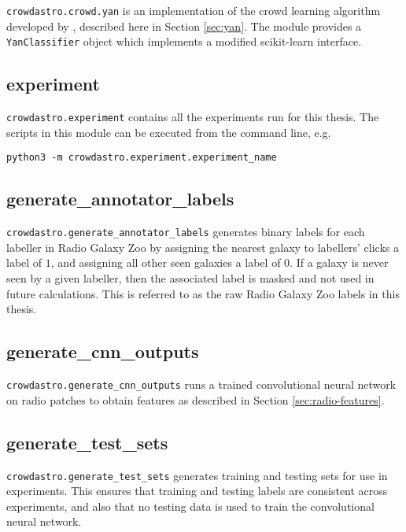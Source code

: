             \texttt{crowdastro.crowd.yan} is an implementation of the crowd
            learning algorithm developed by \citet{yan10}, described here in
            Section \ref{sec:yan}. The module provides a \texttt{YanClassifier}
            object which implements a modified scikit-learn interface.

    \subsection{experiment}
    \label{sec:crowdastro-experiment}

        \texttt{crowdastro.experiment} contains all the experiments run for this
        thesis. The scripts in this module can be executed from the command
        line, e.g.

        \begin{center}
            \texttt{python3 -m crowdastro.experiment.experiment\_name}
        \end{center}

    \subsection{generate\_annotator\_labels}

        \texttt{crowdastro.generate\_annotator\_labels} generates binary labels
        for each labeller in Radio Galaxy Zoo by assigning the nearest galaxy to
        labellers' clicks a label of $1$, and assigning all other seen galaxies
        a label of $0$. If a galaxy is never seen by a given labeller, then the
        associated label is masked and not used in future calculations. This is
        referred to as the raw Radio Galaxy Zoo labels in this thesis.

    \subsection{generate\_cnn\_outputs}

        \texttt{crowdastro.generate\_cnn\_outputs} runs a trained convolutional
        neural network on radio patches to obtain features as described in
        Section \ref{sec:radio-features}.

    \subsection{generate\_test\_sets}

        \texttt{crowdastro.generate\_test\_sets} generates training and testing
        sets for use in experiments. This ensures that training and testing
        labels are consistent across experiments, and also that no testing data
        is used to train the convolutional neural network.


